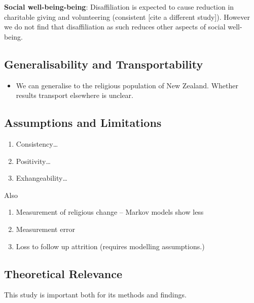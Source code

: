 \documentclass[
  singlecolumn]{report}
\providecommand{\tightlist}{%
  \setlength{\itemsep}{0pt}\setlength{\parskip}{0pt}}\usepackage{longtable,booktabs,array}
\begin{document}
\textbf{Social well-being-being}: Disaffiliation is expected to cause
reduction in charitable giving and volunteering (consistent {[}cite a
different study{]}). However we do not find that disaffiliation as such
reduces other aspects of social well-being.

\hypertarget{generalisability-and-transportability}{%
\subsection{Generalisability and
Transportability}\label{generalisability-and-transportability}}

\begin{itemize}
\tightlist
\item
  We can generalise to the religious population of New Zealand. Whether
  results transport elsewhere is unclear.
\end{itemize}

\hypertarget{assumptions-and-limitations}{%
\subsection{Assumptions and
Limitations}\label{assumptions-and-limitations}}

\begin{enumerate}
\def\labelenumi{\arabic{enumi}.}
\tightlist
\item
  Consistency\ldots{}
\item
  Positivity\ldots{}
\item
  Exhangeability\ldots{}
\end{enumerate}

Also

\begin{enumerate}
\def\labelenumi{\arabic{enumi}.}
\tightlist
\item
  Measurement of religious change -- Markov models show less
\item
  Measurement error
\item
  Loss to follow up attrition (requires modelling assumptions.)
\end{enumerate}

\hypertarget{theoretical-relevance}{%
\subsection{Theoretical Relevance}\label{theoretical-relevance}}

This study is important both for its methods and findings.
\end{document}
